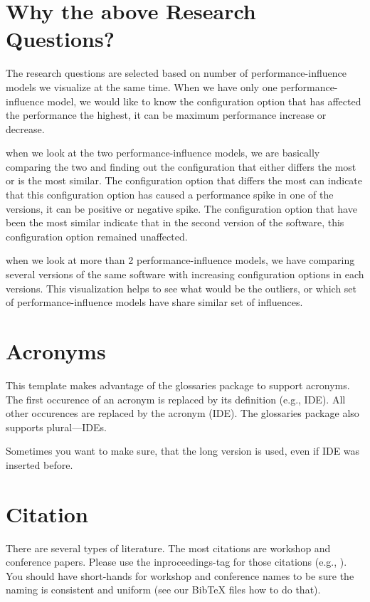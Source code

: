 \section{Why the above Research Questions?}
The research questions are selected based on number of performance-influence models we visualize at the same time. When we have only one performance-influence model, we would like to know the configuration option that has affected the performance the highest, it can be maximum performance increase or decrease. 

when we look at the two performance-influence models, we are basically comparing the two and finding out the configuration that either differs the most or is the most similar. The configuration option that differs the most can indicate that this configuration option has caused a performance spike in one of the versions, it can be positive or negative spike. The configuration option that have been the most similar indicate that in the second version of the software, this configuration option remained unaffected.

when we look at more than 2 performance-influence models, we have comparing several versions of the same software with increasing configuration options in each versions. This visualization helps to see what would be the outliers, or which set of performance-influence models have share similar set of influences.


\section{Acronyms}

This template makes advantage of the glossaries package to support acronyms. The first occurence of an acronym is replaced by its definition (e.g., \gls{IDE}). All other occurences are replaced by the acronym (\gls{IDE}). The glossaries package also supports plural---\glspl{IDE}.

Sometimes you want to make sure, that the long version is used, even if \gls{IDE} was inserted before.
 
\section{Citation}

There are several types of literature. The most citations are workshop and conference papers. Please use the inproceedings-tag for those citations (e.g., \cite{KAK:GPCE09}). You should have short-hands for workshop and conference names to be sure the naming is consistent and uniform (see our BibTeX files how to do that).
 
